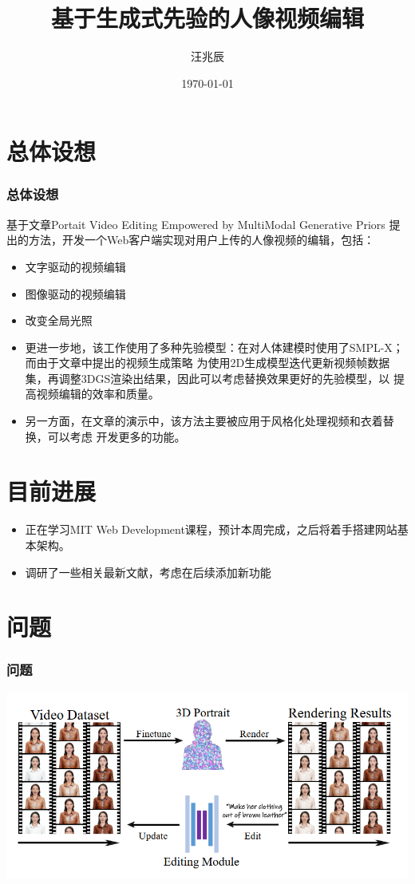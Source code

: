 \documentclass{beamer}
\title{基于生成式先验的人像视频编辑}
\author{汪兆辰}
\date{\ukdate\today}
\begin{document}
\begin{frame}
    \titlepage
\end{frame}

\section{总体设想}

\begin{frame}
    \frametitle{总体设想}
    基于文章Portait Video Editing Empowered by MultiModal Generative Priors
    提出的方法，开发一个Web客户端实现对用户上传的人像视频的编辑，包括：
    \begin{itemize}
        \item 文字驱动的视频编辑
        \item 图像驱动的视频编辑
        \item 改变全局光照
    \end{itemize}
\end{frame}

\begin{frame}
    \begin{itemize}
        \item 更进一步地，该工作使用了多种先验模型：在对人体建模时使用了SMPL-X；而由于文章中提出的视频生成策略
    为使用2D生成模型迭代更新视频帧数据集，再调整3DGS渲染出结果，因此可以考虑替换效果更好的先验模型，以
    提高视频编辑的效率和质量。
    
        \item 另一方面，在文章的演示中，该方法主要被应用于风格化处理视频和衣着替换，可以考虑
    开发更多的功能。
    \end{itemize}
\end{frame}

\section{目前进展}

\begin{frame}
    \begin{itemize}
        \frametitle{目前进展}
        \item 正在学习MIT Web Development课程，预计本周完成，之后将着手搭建网站基本架构。
        \item 调研了一些相关最新文献，考虑在后续添加新功能
    \end{itemize}
\end{frame}

\section{问题}

\begin{frame}
    \frametitle{问题}
    \includegraphics[width=\textwidth]{pic1.png}
\end{frame}
\end{document}
